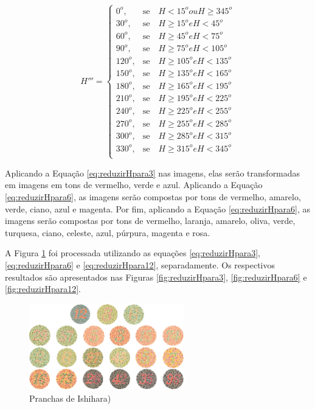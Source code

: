 \documentclass[	12pt, Times, openright, twoside, a4paper, english, brazil]{abntex2}
\begin{document}
\begin{equation}
\label{eq:reduzirHpara12}
H'''=\left\{
\begin{array}{rc}
    0^o,&\mbox{se}\quad H <15^o ou H \geq 345^o \\
    30^o,&\mbox{se}\quad H \geq 15^o e H < 45^o \\
    60^o,&\mbox{se}\quad H \geq 45^o e H < 75^o \\
    90^o,&\mbox{se}\quad H \geq 75^o e H < 105^o \\
    120^o,&\mbox{se}\quad H \geq 105^o e H < 135^o \\
    150^o,&\mbox{se}\quad H \geq 135^o e H < 165^o \\
    180^o,&\mbox{se}\quad H \geq 165^o e H < 195^o \\
    210^o,&\mbox{se}\quad H \geq 195^o e H < 225^o \\
    240^o,&\mbox{se}\quad H \geq 225^o e H < 255^o \\
    270^o,&\mbox{se}\quad H \geq 255^o e H < 285^o \\
    300^o,&\mbox{se}\quad H \geq 285^o e H < 315^o \\
    330^o,&\mbox{se}\quad H \geq 315^o e H < 345^o \\
\end{array}\right.
\end{equation}

Aplicando a Equação \ref{eq:reduzirHpara3} nas imagens, elas serão transformadas em imagens em tons de vermelho, verde e azul. Aplicando a Equação \ref{eq:reduzirHpara6}, as imagens serão compostas por tons de vermelho, amarelo, verde, ciano, azul e magenta. Por fim, aplicando a Equação \ref{eq:reduzirHpara6}, as imagens serão compostas por tons de vermelho, laranja, amarelo, oliva, verde, turquesa, ciano, celeste, azul, púrpura, magenta e rosa.

A Figura \ref{fig:platesIshihara} foi processada utilizando as equações \ref{eq:reduzirHpara3}, \ref{eq:reduzirHpara6} e \ref{eq:reduzirHpara12}, separadamente. Os respectivos resultados são apresentados nas Figuras \ref{fig:reduzirHpara3}, \ref{fig:reduzirHpara6} e \ref{fig:reduzirHpara12}.

\begin{figure}[!htb]
\centering \includegraphics[width=0.60\textwidth]{platesIshihara.png}
\caption{Pranchas de Ishihara) \label{fig:platesIshihara}}
\end{figure}
\end{document}
